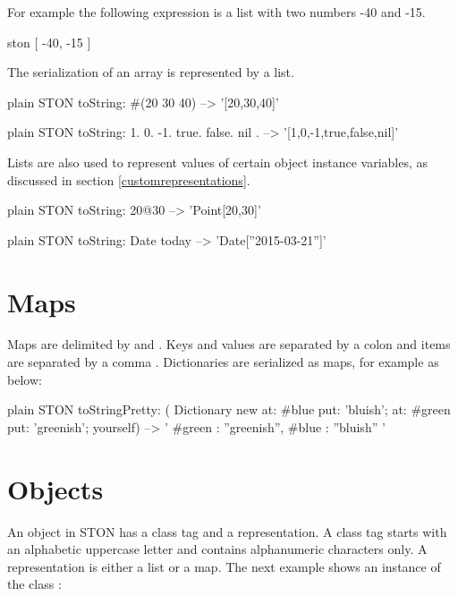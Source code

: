 \documentclass[10pt,twoside,english]{_support/latex/sbabook/sbabook}
\begin{document}
For example the following expression is a list with two numbers -40 and -15.

\begin{displaycode}{ston}
[ -40, -15 ]
\end{displaycode}

The serialization of an array is represented by a list.

\begin{displaycode}{plain}
STON toString: #(20 30 40)
   --> '[20,30,40]'
\end{displaycode}

\begin{displaycode}{plain}
STON toString:  { 1. 0. -1. true. false. nil }.
   --> '[1,0,-1,true,false,nil]'
\end{displaycode}

Lists are also used to represent values of certain object instance variables, as discussed in section \ref{customrepresentations}.

\begin{displaycode}{plain}
STON toString: 20@30
   --> 'Point[20,30]'
\end{displaycode}

\begin{displaycode}{plain}
STON toString: Date today
   --> 'Date[''2015-03-21'']'
\end{displaycode}
\section{Maps}
Maps are delimited by \textcode{\{} and \textcode{\}}. Keys and values are separated by a colon \textcode{:} and items are separated by a comma \textcode{,}. Dictionaries are serialized as
maps, for example as below:

\begin{displaycode}{plain}
STON toStringPretty: (
   Dictionary new
      at: #blue
      put: 'bluish';
      at: #green
      put: 'greenish';
      yourself)
   -->
'{
   #green : ''greenish'',
   #blue : ''bluish''
}'
\end{displaycode}
\section{Objects}
An object in STON has a class tag and a representation. A class tag starts with an alphabetic uppercase letter
and contains alphanumeric characters only. A representation is either a list or a map.
The next example shows an instance of the class :
\end{document}
